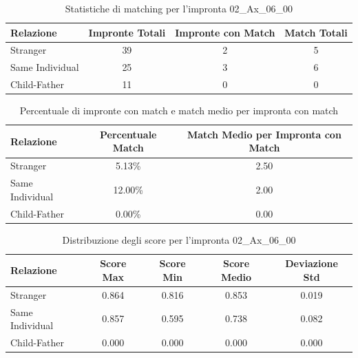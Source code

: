\begin{table}[htbp]
\centering
\caption{Statistiche di matching per l'impronta 02\_Ax\_06\_00}
\label{tab:results_02_Ax_06_00}
\begin{tabular}{|l|c|c|c|}
\hline
\textbf{Relazione} & \textbf{Impronte Totali} & \textbf{Impronte con Match} & \textbf{Match Totali} \\
\hline
Stranger & 39 & 2 & 5 \\
\hline
Same Individual & 25 & 3 & 6 \\
\hline
Child-Father & 11 & 0 & 0 \\
\hline
\end{tabular}
\end{table}


\begin{table}[htbp]
\centering
\caption{Percentuale di impronte con match e match medio per impronta con match}
\label{tab:match_percentage_02_Ax_06_00}
\begin{tabular}{|l|c|c|}
\hline
\textbf{Relazione} & \textbf{Percentuale Match} & \textbf{Match Medio per Impronta con Match} \\
\hline
Stranger & 5.13\% & 2.50 \\
\hline
Same Individual & 12.00\% & 2.00 \\
\hline
Child-Father & 0.00\% & 0.00 \\
\hline
\end{tabular}
\end{table}


\begin{table}[htbp]
\centering
\caption{Distribuzione degli score per l'impronta 02\_Ax\_06\_00}
\label{tab:scores_02_Ax_06_00}
\begin{tabular}{|l|c|c|c|c|}
\hline
\textbf{Relazione} & \textbf{Score Max} & \textbf{Score Min} & \textbf{Score Medio} & \textbf{Deviazione Std} \\
\hline
Stranger & 0.864 & 0.816 & 0.853 & 0.019 \\
\hline
Same Individual & 0.857 & 0.595 & 0.738 & 0.082 \\
\hline
Child-Father & 0.000 & 0.000 & 0.000 & 0.000 \\
\hline
\end{tabular}
\end{table}

